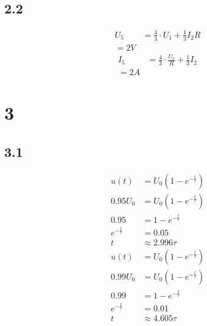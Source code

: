 \documentclass{article}
\begin{document}
\subsection*{2.2}
\begin{align*}
    U_5 &= \frac{4}{3}\cdot U_1 + \frac{1}{3}I_2R\\
    = 2V
\end{align*}
\begin{align*}
    I_5 &=\frac{4}{3}\cdot\frac{U_1}{R} + \frac{1}{3}I_2\\
    = 2A
\end{align*}
\section*{3}
\subsection*{3.1}
\begin{align*}
    u(t) &= U_0 (1-e^{-\frac{t}{\tau}})\\
    0.95 U_0 &= U_0 (1-e^{-\frac{t}{\tau}})\\
    0.95 &=1-e^{-\frac{t}{\tau}}\\
    e^{-\frac{t}{\tau}} &= 0.05\\
    t &\approx 2.996 \tau
\end{align*}
\begin{align*}
    u(t) &= U_0 (1-e^{-\frac{t}{\tau}})\\
    0.99 U_0 &= U_0 (1-e^{-\frac{t}{\tau}})\\
    0.99 &=1-e^{-\frac{t}{\tau}}\\
    e^{-\frac{t}{\tau}} &= 0.01\\
    t &\approx 4.605 \tau
\end{align*}
\end{document}
